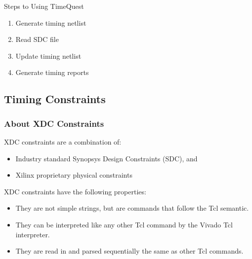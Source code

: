 Steps to Using TimeQuest
\begin{enumerate}
    \item Generate timing netlist
    \item Read SDC file
    \item Update timing netlist
    \item Generate timing reports
\end{enumerate}

\subsection{Timing Constraints}
\subsubsection{About XDC Constraints}
XDC constraints are a combination of:
\begin{itemize}
    \item Industry standard Synopsys Design Constraints (SDC), and
    \item Xilinx proprietary physical constraints
\end{itemize}

XDC constraints have the following properties:
\begin{itemize}
    \item They are not simple strings, but are commands that follow the Tcl semantic.
    \item They can be interpreted like any other Tcl command by the Vivado Tcl interpreter.
    \item They are read in and parsed sequentially the same as other Tcl commands.
\end{itemize}

